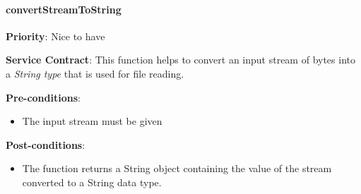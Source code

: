 		\paragraph{convertStreamToString}
			\begin{description}
			    \item{\textbf{Priority}:} Nice to have%
			    \item{\textbf{Service Contract}:} This function helps to convert an input stream of bytes into a \textit{String type} that is used for file reading.%
			    \item{\textbf{Pre-conditions}:}%
    			    \begin{itemize}
    			        \item The input stream must be given
    			    \end{itemize}
			    \item{\textbf{Post-conditions}:} %
    			    \begin{itemize}
    			    \item The function returns a String object containing the value of the stream converted to a String data type. 
    			    \end{itemize}
			\end{description}



